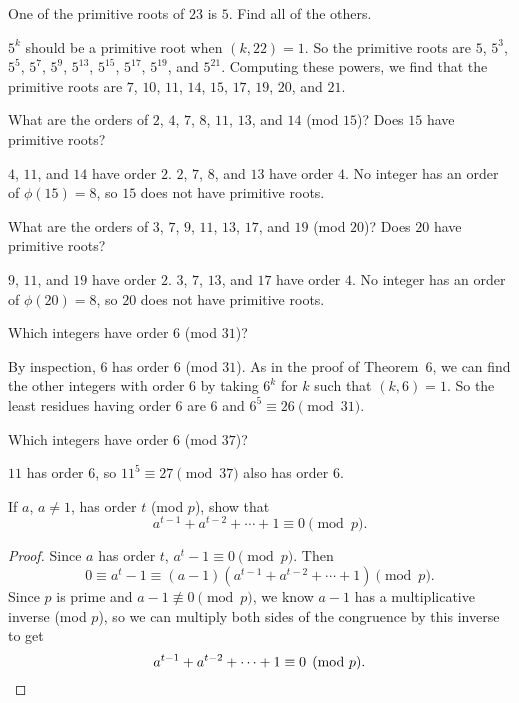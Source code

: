  One of the primitive roots of $23$ is $5$. Find all of the
others.
\begin{solution}
  $5^k$ should be a primitive root when $(k,22) = 1$. So the primitive
  roots are $5$, $5^3$, $5^5$, $5^7$, $5^9$, $5^{13}$, $5^{15}$,
  $5^{17}$, $5^{19}$, and $5^{21}$. Computing these powers, we find
  that the primitive roots are $7$, $10$, $11$, $14$, $15$, $17$,
  $19$, $20$, and $21$.
\end{solution}

 What are the orders of $2$, $4$, $7$, $8$, $11$, $13$, and
$14$ (mod $15$)? Does $15$ have primitive roots?
\begin{solution}
  $4$, $11$, and $14$ have order $2$. $2$, $7$, $8$, and $13$ have
  order $4$. No integer has an order of $\phi(15) = 8$, so $15$ does
  not have primitive roots.
\end{solution}

 What are the orders of $3$, $7$, $9$, $11$, $13$, $17$, and
$19$ (mod $20$)? Does $20$ have primitive roots?
\begin{solution}
  $9$, $11$, and $19$ have order $2$. $3$, $7$, $13$, and $17$ have
  order $4$. No integer has an order of $\phi(20) = 8$, so $20$ does
  not have primitive roots.
\end{solution}

 Which integers have order $6$ (mod $31$)?
\begin{solution}
  By inspection, $6$ has order $6$ (mod $31$). As in the proof of
  Theorem~6, we can find the other integers with order $6$ by taking
  $6^k$ for $k$ such that $(k,6) = 1$. So the least residues having
  order $6$ are $6$ and $6^5\equiv26\pmod{31}$.
\end{solution}

 Which integers have order $6$ (mod $37$)?
\begin{solution}
  $11$ has order $6$, so $11^5\equiv27\pmod{37}$ also has order $6$.
\end{solution}

 If $a$, $a\neq1$, has order $t$ (mod $p$), show that
\begin{equation*}
  a^{t-1} + a^{t-2} + \cdots + 1 \equiv 0\pmod{p}.
\end{equation*}
\begin{proof}
  Since $a$ has order $t$, $a^t-1\equiv0\pmod{p}$. Then
  \begin{equation*}
    0\equiv a^t - 1 \equiv
    (a - 1)(a^{t-1} + a^{t-2} + \cdots + 1)\pmod{p}.
  \end{equation*}
  Since $p$ is prime and $a - 1\not\equiv0\pmod{p}$, we know $a - 1$
  has a multiplicative inverse (mod $p$), so we can multiply both
  sides of the congruence by this inverse to get
  \begin{equation*}
    a^{t-1} + a^{t-2} + \cdots + 1 \equiv 0\pmod{p}. \qedhere
  \end{equation*}
\end{proof}

